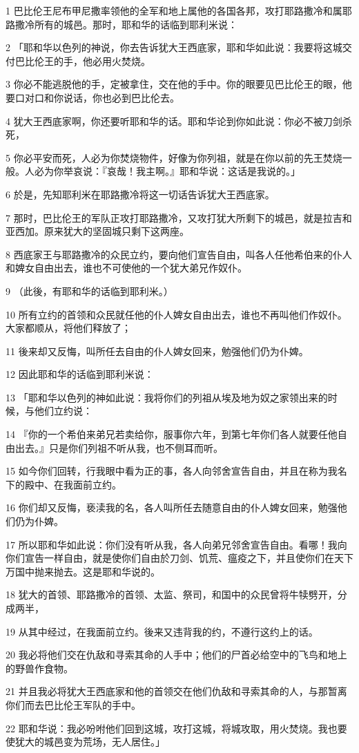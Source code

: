 \par 1 巴比伦王尼布甲尼撒率领他的全军和地上属他的各国各邦，攻打耶路撒冷和属耶路撒冷所有的城邑。那时，耶和华的话临到耶利米说：
\par 2 「耶和华以色列的神说，你去告诉犹大王西底家，耶和华如此说：我要将这城交付巴比伦王的手，他必用火焚烧。
\par 3 你必不能逃脱他的手，定被拿住，交在他的手中。你的眼要见巴比伦王的眼，他要口对口和你说话，你也必到巴比伦去。
\par 4 犹大王西底家啊，你还要听耶和华的话。耶和华论到你如此说：你必不被刀剑杀死，
\par 5 你必平安而死，人必为你焚烧物件，好像为你列祖，就是在你以前的先王焚烧一般。人必为你举哀说：『哀哉！我主啊。』耶和华说：这话是我说的。」
\par 6 於是，先知耶利米在耶路撒冷将这一切话告诉犹大王西底家。
\par 7 那时，巴比伦王的军队正攻打耶路撒冷，又攻打犹大所剩下的城邑，就是拉吉和亚西加。原来犹大的坚固城只剩下这两座。
\par 8 西底家王与耶路撒冷的众民立约，要向他们宣告自由，叫各人任他希伯来的仆人和婢女自由出去，谁也不可使他的一个犹大弟兄作奴仆。
\par 9 （此後，有耶和华的话临到耶利米。）
\par 10 所有立约的首领和众民就任他的仆人婢女自由出去，谁也不再叫他们作奴仆。大家都顺从，将他们释放了；
\par 11 後来却又反悔，叫所任去自由的仆人婢女回来，勉强他们仍为仆婢。
\par 12 因此耶和华的话临到耶利米说：
\par 13 「耶和华以色列的神如此说：我将你们的列祖从埃及地为奴之家领出来的时候，与他们立约说：
\par 14 『你的一个希伯来弟兄若卖给你，服事你六年，到第七年你们各人就要任他自由出去。』只是你们列祖不听从我，也不侧耳而听。
\par 15 如今你们回转，行我眼中看为正的事，各人向邻舍宣告自由，并且在称为我名下的殿中、在我面前立约。
\par 16 你们却又反悔，亵渎我的名，各人叫所任去随意自由的仆人婢女回来，勉强他们仍为仆婢。
\par 17 所以耶和华如此说：你们没有听从我，各人向弟兄邻舍宣告自由。看哪！我向你们宣告一样自由，就是使你们自由於刀剑、饥荒、瘟疫之下，并且使你们在天下万国中抛来抛去。这是耶和华说的。
\par 18 犹大的首领、耶路撒冷的首领、太监、祭司，和国中的众民曾将牛犊劈开，分成两半，
\par 19 从其中经过，在我面前立约。後来又违背我的约，不遵行这约上的话。
\par 20 我必将他们交在仇敌和寻索其命的人手中；他们的尸首必给空中的飞鸟和地上的野兽作食物。
\par 21 并且我必将犹大王西底家和他的首领交在他们仇敌和寻索其命的人，与那暂离你们而去巴比伦王军队的手中。
\par 22 耶和华说：我必吩咐他们回到这城，攻打这城，将城攻取，用火焚烧。我也要使犹大的城邑变为荒场，无人居住。」

